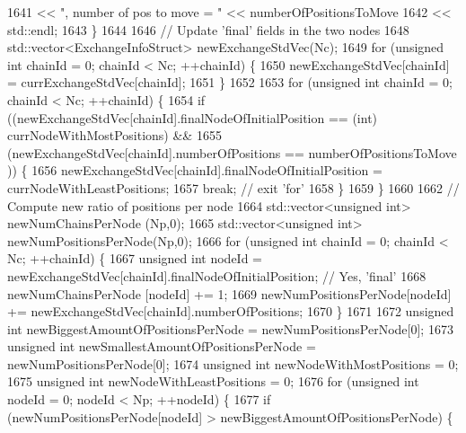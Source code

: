 \begin{DoxyCode}
1641                               << \textcolor{stringliteral}{", number of pos to move = "} << numberOfPositionsToMove
1642                               << std::endl;
1643     \}
1644 
1646     \textcolor{comment}{// Update 'final' fields in the two nodes}
1648 \textcolor{comment}{}    std::vector<ExchangeInfoStruct> newExchangeStdVec(Nc);
1649     \textcolor{keywordflow}{for} (\textcolor{keywordtype}{unsigned} \textcolor{keywordtype}{int} chainId = 0; chainId < Nc; ++chainId) \{
1650       newExchangeStdVec[chainId] = currExchangeStdVec[chainId];
1651     \}
1652 
1653     \textcolor{keywordflow}{for} (\textcolor{keywordtype}{unsigned} \textcolor{keywordtype}{int} chainId = 0; chainId < Nc; ++chainId) \{
1654       \textcolor{keywordflow}{if} ((newExchangeStdVec[chainId].finalNodeOfInitialPosition == (\textcolor{keywordtype}{int}) currNodeWithMostPositions) &&
1655           (newExchangeStdVec[chainId].numberOfPositions          == numberOfPositionsToMove        )) \{
1656         newExchangeStdVec[chainId].finalNodeOfInitialPosition = currNodeWithLeastPositions;
1657         \textcolor{keywordflow}{break}; \textcolor{comment}{// exit 'for'}
1658       \}
1659     \}
1660 
1662     \textcolor{comment}{// Compute new ratio of positions per node}
1664 \textcolor{comment}{}    std::vector<unsigned int> newNumChainsPerNode   (Np,0);
1665     std::vector<unsigned int> newNumPositionsPerNode(Np,0);
1666     \textcolor{keywordflow}{for} (\textcolor{keywordtype}{unsigned} \textcolor{keywordtype}{int} chainId = 0; chainId < Nc; ++chainId) \{
1667       \textcolor{keywordtype}{unsigned} \textcolor{keywordtype}{int} nodeId = newExchangeStdVec[chainId].finalNodeOfInitialPosition; \textcolor{comment}{// Yes, 'final'}
1668       newNumChainsPerNode   [nodeId] += 1;
1669       newNumPositionsPerNode[nodeId] += newExchangeStdVec[chainId].numberOfPositions;
1670     \}
1671 
1672     \textcolor{keywordtype}{unsigned} \textcolor{keywordtype}{int} newBiggestAmountOfPositionsPerNode  = newNumPositionsPerNode[0];
1673     \textcolor{keywordtype}{unsigned} \textcolor{keywordtype}{int} newSmallestAmountOfPositionsPerNode = newNumPositionsPerNode[0];
1674     \textcolor{keywordtype}{unsigned} \textcolor{keywordtype}{int} newNodeWithMostPositions = 0;
1675     \textcolor{keywordtype}{unsigned} \textcolor{keywordtype}{int} newNodeWithLeastPositions = 0;
1676     \textcolor{keywordflow}{for} (\textcolor{keywordtype}{unsigned} \textcolor{keywordtype}{int} nodeId = 0; nodeId < Np; ++nodeId) \{
1677       \textcolor{keywordflow}{if} (newNumPositionsPerNode[nodeId] > newBiggestAmountOfPositionsPerNode) \{

\end{DoxyCode}
